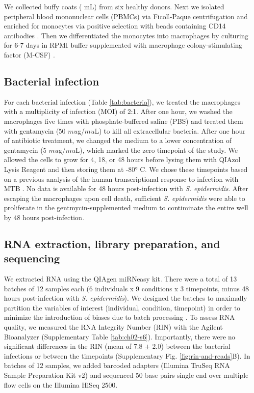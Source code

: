 We collected buffy coats ( mL) from six healthy donors. Next
we isolated peripheral blood mononuclear cells (PBMCs) via
Ficoll-Paque centrifugation \citep{Rivero-Lezcano2012} and enriched
for monocytes via positive selection with beads containing CD14
antibodies \citep{Barreiro2012}. Then we differentiated the monocytes
into macrophages by culturing for 6-7 days in RPMI buffer supplemented
with macrophage colony-stimulating factor (M-CSF)
\citep{Tailleux2003}.

\subsection{Bacterial infection}\label{bacterial-infection}

For each bacterial infection (Table \ref{tab:bacteria}), we treated
the macrophages with a multiplicity of infection (MOI) of 2:1. After
one hour, we washed the macrophages five times with phosphate-buffered
saline (PBS) and treated them with gentamycin (50 $mu$g/$mu$L) to kill
all extracellular bacteria.  After one hour of antibiotic treatment,
we changed the medium to a lower concentration of gentamycin (5
$mu$g/$mu$L), which marked the zero timepoint of the study. We allowed
the cells to grow for 4, 18, or 48 hours before lysing them with
QIAzol Lysis Reagent and then storing them at -80° C.  We chose these
timepoints based on a previous analysis of the human transcriptional
response to infection with MTB \citep{Tailleux2008}. No data is
available for 48 hours post-infection with \emph{S.
  epidermidis}. After escaping the macrophages upon cell death,
sufficient \emph{S. epidermidis} were able to proliferate in the
gentmycin-supplemented medium to contiminate the entire well by 48
hours post-infection.

\subsection{RNA extraction, library preparation, and
sequencing}\label{rna-extraction-library-preparation-and-sequencing}

We extracted RNA using the QIAgen miRNeasy kit. There were a total of
13 batches of 12 samples each (6 individuals x 9 conditions x 3
timepoints, minus 48 hours post-infection with
\emph{S. epidermidis}). We designed the batches to maximally partition
the variables of interest (individual, condition, timepoint) in order
to minimize the introduction of biases due to batch processing
\citep{Auer2010}. To assess RNA quality, we measured the RNA Integrity
Number (RIN) with the Agilent Bioanalyzer (Supplementary Table
\ref{tab:ch02-s6}). Importantly, there were no significant differences
in the RIN (mean of 7.8 $\pm$ 2.0) between the bacterial infections or
between the timepoints (Supplementary
Fig. \ref{fig:rin-and-reads}B). In batches of 12 samples, we added
barcoded adapters (Illumina TruSeq RNA Sample Preparation Kit v2) and
sequenced 50 base pairs single end over multiple flow cells on the
Illumina HiSeq 2500.


